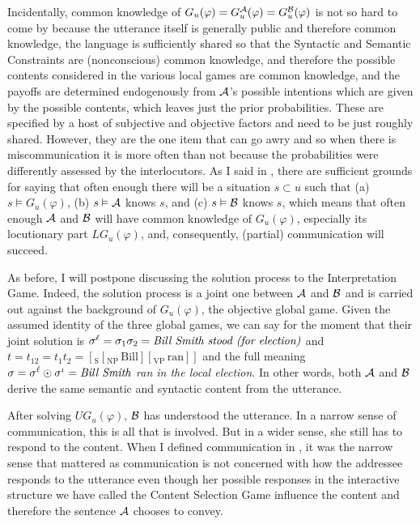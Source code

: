 Incidentally, common knowledge of $G_u(\varphi) = G^{\cal A}_u(\varphi) = G^{\cal B}_u(\varphi)$ is not so hard to come by because the utterance itself is generally public and therefore common knowledge, the language is sufficiently shared so that the Syntactic and Semantic Constraints are (nonconscious) common knowledge, and therefore the possible contents considered in the various local games are common knowledge, and the payoffs are determined endogenously from $\cal A$'s possible intentions which are given by the possible contents, which leaves just the prior probabilities. These are specified by a host of subjective and objective factors and need to be just roughly shared. However, they are the one item that can go awry and so when there is miscommunication it is more often than not because the probabilities were differently assessed by the interlocutors. As I said in , there are sufficient grounds for saying that often enough there will be a situation $s \subset u$ such that (a) $s \vDash G_u(\varphi)$, (b) $s \vDash {\cal A}$ \hbox{knows} $s$, and (c) $s \vDash {\cal B}$ \hbox{knows} $s$, which means that often enough $\cal A$ and $\cal B$ will have common knowledge of $G_u(\varphi)$, especially its locutionary part $LG_u(\varphi)$, and, consequently, (partial) communication will succeed.

As before, I will postpone discussing the solution process to the Interpretation Game. Indeed, the solution process is a joint one between $\cal A$ and $\cal B$ and is carried out against the background of $G_u(\varphi)$, the objective global game. Given the assumed identity of the three global games, we can say for the moment that their joint solution is $\sigma^{\ell} = \sigma_1\sigma_2 = \emph{Bill Smith stood (for election)}$ and $t = t_{12} = t_1t_2 = [_{\mathrm{S}}[_{\mathrm{NP}}\, \mathrm{Bill}][_{\mathrm{VP}}\, \mathrm{ran}]]$ and the full meaning $\sigma = \sigma^{\ell} \odot \sigma^{\iota} = \emph{Bill Smith}$ \emph{ran in the local election}. In other words, both $\cal A$ and $\cal B$ derive the same semantic and syntactic content from the utterance.

After solving $UG_u(\varphi)$, $\cal B$ has understood the utterance. In a narrow sense of communication, this is all that is involved. But in a wider sense, she still has to respond to the content. When I defined communication in , it was the narrow sense that mattered as communication is not concerned with how the addressee responds to the utterance even though her possible responses in the interactive structure we have called the Content Selection Game influence the content and therefore the sentence $\cal A$ chooses to convey.


